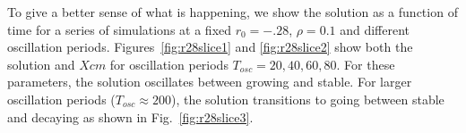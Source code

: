\documentclass[pre,preprint,superscriptaddress]{revtex4-1}
\begin{document}
To give a better sense of what is happening, we show the solution as a function of time for a series of simulations at a fixed $r_0=-.28$, $\rho=0.1$ and different oscillation periods. Figures~\ref{fig:r28slice1} and \ref{fig:r28slice2} show both the solution and $Xcm$ for oscillation periods $T_{osc}=20,40,60,80$.  For these parameters, the solution oscillates between growing and stable. For larger oscillation periods ($T_{osc} \approx 200$), the solution transitions to going between stable and decaying as shown in Fig.~\ref{fig:r28slice3}.  
 \begin{figure}[!htb]
  \begin{center}
    \mbox{
      	\quad 
      } \mbox{
      	\quad 
}
\end{center}
\end{figure}
\end{document}
